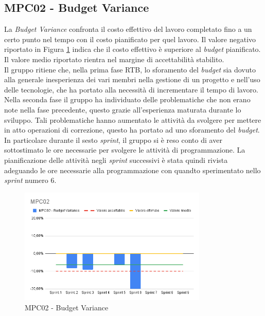 \subsection{MPC02 - Budget Variance}
\label{s:mpc02}
La \textit{Budget Variance} confronta il costo effettivo del lavoro completato fino a un certo punto nel tempo con il costo pianificato per quel lavoro.
Il valore negativo riportato in Figura \ref{fig:mpc02} indica che il costo effettivo è superiore al \textit{budget} pianificato.
Il valore medio riportato rientra nel margine di accettabilità stabilito. \\
Il gruppo ritiene che, nella prima fase RTB, lo sforamento del \textit{budget} sia dovuto alla generale inesperienza dei vari membri nella gestione di un progetto e nell'uso delle tecnologie, che ha portato alla necessità di incrementare il tempo di lavoro.\\
Nella seconda fase il gruppo ha individuato delle problematiche che non erano note nella fase precedente, questo grazie all'esperienza maturata durante lo sviluppo.
Tali problematiche hanno aumentato le attività da svolgere per mettere in atto operazioni di correzione, questo ha portato ad uno sforamento del \textit{budget}.
In particolare durante il sesto \textit{sprint}, il gruppo si è reso conto di aver sottostimato le ore necessarie per svolgere le attività di programmazione.
La pianificazione delle attività negli \textit{sprint} successivi è stata quindi rivista adeguando le ore necessarie alla programmazione con quandto sperimentato nello \textit{sprint} numero 6.

\begin{figure}[ht]
    \centering
    \includegraphics[width=0.8\textwidth]{img/MPC02.png}
    \caption{MPC02 - Budget Variance}
    \label{fig:mpc02}
\end{figure}

\newpage


